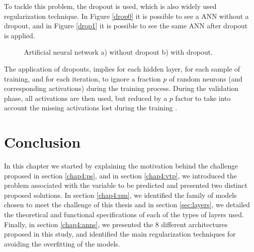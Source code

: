 To tackle this problem, the dropout is used, which is also widely used regularization technique. In Figure \ref{drop0} it is possible to see a \ac{ANN} without a dropout, and in Figure \ref{drop1} it is possible to see the same \ac{ANN} after dropout is applied.

\begin{figure}[h!]
\captionsetup[subfigure]{position=b}
\centering
\label{fig:drop}
\hspace{0.05\textwidth}
\caption{Artificial neural network a) without dropout b) with dropout.}
\end{figure}

The application of dropouts, implies for each hidden layer, for each sample of training, and for each iteration, to ignore a fraction $p$ of random neurons (and corresponding activations) during the training process. During the validation phase, all activations are then used, but reduced by a $p$ factor to take into account the missing activations lost during the training \cite{drop0}.

\section{Conclusion}

In this chapter we started by explaining the motivation behind the challenge proposed in section \ref{chap4:ps}, and in section \ref{chap4:vtp}, we introduced the problem associated with the variable to be predicted and presented two distinct proposed solutions. In section \ref{chap4:pm}, we identified the family of models chosen to meet the challenge of this thesis and in section \ref{sec:layers}, we detailed the theoretical and functional specifications of each of the types of layers used. Finally, in section \ref{chap4:anns}, we presented the 8 different architectures proposed in this study, and identified the main regularization techniques for avoiding the overfitting of the models. 
